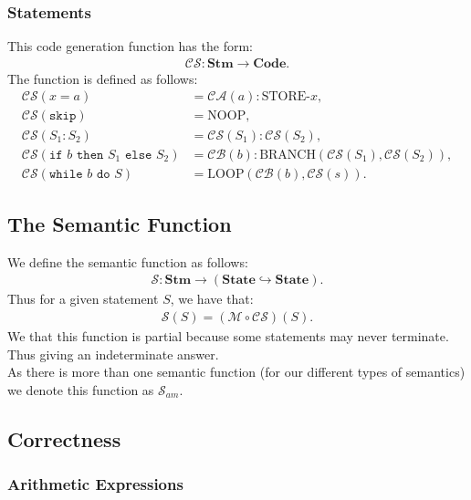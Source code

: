 \subsubsection{Statements}

This code generation function has the form: \begin{gather*}
  \mathcal{CS} : \textbf{Stm} \to \textbf{Code}.
\end{gather*} The function is defined as follows: \begin{align*}
  \mathcal{CS}(x = a) &= \mathcal{CA}(a):\text{STORE-}x, \\
  \mathcal{CS}(\texttt{skip}) &= \text{NOOP}, \\
  \mathcal{CS}(S_1:S_2) &= \mathcal{CS}(S_1):\mathcal{CS}(S_2), \\
  \mathcal{CS}(
    \texttt{if } b \texttt{ then } S_1 \texttt{ else } S_2
  ) &= \mathcal{CB}(b):\text{BRANCH}(\mathcal{CS}(S_1), \mathcal{CS}(S_2)), \\
  \mathcal{CS}(
    \texttt{while } b \texttt{ do } S
  ) &= \text{LOOP}(\mathcal{CB}(b), \mathcal{CS}(s)).
\end{align*}

\subsection{The Semantic Function}

We define the semantic function as follows: \begin{gather*}
  \mathcal{S}: \textbf{Stm} \to (\textbf{State} \hookrightarrow \textbf{State}).
\end{gather*} Thus for a given statement $S$, we have that: \begin{gather*}
  \mathcal{S}(S) = (\mathcal{M} \circ \mathcal{CS})(S).
\end{gather*} We that this function is partial because some statements
may never terminate. Thus giving an indeterminate answer.
\\[\baselineskip]
As there is more than one semantic function (for our different types
of semantics) we denote this function as $\mathcal{S}_{am}$.

\subsection{Correctness}

\subsubsection{Arithmetic Expressions}

